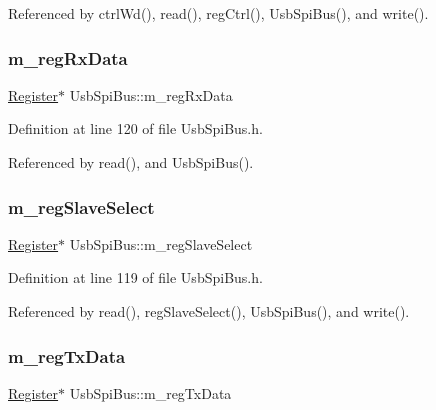 Referenced by ctrl\+Wd(), read(), reg\+Ctrl(), Usb\+Spi\+Bus(), and write().

\mbox{\label{classUsbSpiBus_ab59fb8ae67f97818d8cc6e0daf324cf6}} 
\subsubsection{\texorpdfstring{m\+\_\+reg\+Rx\+Data}{m\_regRxData}}
{\footnotesize\ttfamily \hyperlink{classRegister}{Register}$\ast$ Usb\+Spi\+Bus\+::m\+\_\+reg\+Rx\+Data\hspace{0.3cm}{\ttfamily [private]}}



Definition at line 120 of file Usb\+Spi\+Bus.\+h.



Referenced by read(), and Usb\+Spi\+Bus().

\mbox{\label{classUsbSpiBus_a5cdebdc06a79322c0802fbc523cade91}} 
\subsubsection{\texorpdfstring{m\+\_\+reg\+Slave\+Select}{m\_regSlaveSelect}}
{\footnotesize\ttfamily \hyperlink{classRegister}{Register}$\ast$ Usb\+Spi\+Bus\+::m\+\_\+reg\+Slave\+Select\hspace{0.3cm}{\ttfamily [private]}}



Definition at line 119 of file Usb\+Spi\+Bus.\+h.



Referenced by read(), reg\+Slave\+Select(), Usb\+Spi\+Bus(), and write().

\mbox{\label{classUsbSpiBus_ae4b9ec4d035b9a507735b28dba04556c}} 
\subsubsection{\texorpdfstring{m\+\_\+reg\+Tx\+Data}{m\_regTxData}}
{\footnotesize\ttfamily \hyperlink{classRegister}{Register}$\ast$ Usb\+Spi\+Bus\+::m\+\_\+reg\+Tx\+Data\hspace{0.3cm}{\ttfamily [private]}}



